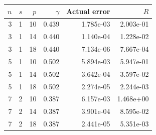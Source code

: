 \begin{tabular}{rrrrrr}
\toprule
$n$ & $s$ & $p$ & $\gamma$ & Actual error & $R$\\
\midrule
3 & 1 & 10 & 0.439 & 1.785e-03 & 2.003e-01 \\
3 & 1 & 14 & 0.440 & 1.140e-04 & 1.228e-02 \\
3 & 1 & 18 & 0.440 & 7.134e-06 & 7.667e-04 \\
5 & 1 & 10 & 0.502 & 5.894e-03 & 5.947e-01 \\
5 & 1 & 14 & 0.502 & 3.642e-04 & 3.597e-02 \\
5 & 1 & 18 & 0.502 & 2.274e-05 & 2.244e-03 \\
7 & 2 & 10 & 0.387 & 6.157e-03 & 1.468e+00 \\
7 & 2 & 14 & 0.387 & 3.901e-04 & 8.595e-02 \\
7 & 2 & 18 & 0.387 & 2.441e-05 & 5.351e-03 \\
\bottomrule
\end{tabular}
